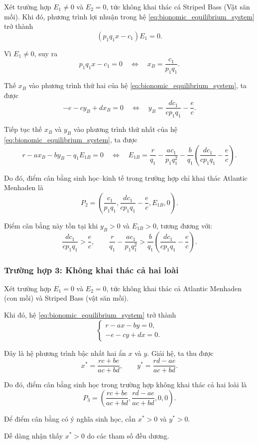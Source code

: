 Xét trường hợp $E_1\neq 0$ và $E_2=0$, tức không khai thác cá Striped Bass (Vật săn mồi).
Khi đó, phương trình lợi nhuận trong hệ
\eqref{eq:bionomic_equilibrium_system} trở thành
\[
(p_1q_1x-c_1)E_1=0.
\]

Vì $E_1\neq 0$, suy ra
\[
p_1q_1x-c_1=0
\quad\Longleftrightarrow\quad
x_B=\frac{c_1}{p_1q_1}.
\]

Thế $x_B$ vào phương trình thứ hai của hệ
\eqref{eq:bionomic_equilibrium_system}, ta được
\[
-e-cy_B+dx_B=0
\quad\Longleftrightarrow\quad
y_B=
\frac{dc_1}{cp_1q_1}-\frac{e}{c}.
\]

Tiếp tục thế $x_B$ và $y_B$ vào phương trình thứ nhất của hệ
\eqref{eq:bionomic_equilibrium_system}, ta được
\[
r-ax_B-by_B-q_1E_{1B}=0
\quad\Longleftrightarrow\quad
E_{1B}
=
\frac{r}{q_1}
-
\frac{ac_1}{p_1q_1^2}
-
\frac{b}{q_1}
\left(
\frac{dc_1}{cp_1q_1}-\frac{e}{c}
\right).
\]

Do đó, điểm cân bằng sinh học--kinh tế trong trường hợp chỉ khai thác
Atlantic Menhaden là
\[
P_2
=
\left(
\frac{c_1}{p_1q_1},
\frac{dc_1}{cp_1q_1}-\frac{e}{c},
E_{1B},
0
\right).
\]

Điểm cân bằng này tồn tại khi $y_B>0$ và $E_{1B}>0$, tương đương với:
\[
\frac{dc_1}{cp_1q_1}>\frac{e}{c},
\qquad
\frac{r}{q_1}
-
\frac{ac_1}{p_1q_1^2}
>
\frac{b}{q_1}
\left(
\frac{dc_1}{cp_1q_1}-\frac{e}{c}
\right).
\]

\subsubsection{Trường hợp 3: Không khai thác cả hai loài}

Xét trường hợp $E_1=0$ và $E_2=0$, tức không khai thác cả Atlantic Menhaden (con mồi) và Striped Bass (vật săn mồi).

Khi đó, hệ \eqref{eq:bionomic_equilibrium_system} trở thành
\[
\begin{cases}
r-ax-by=0,\\
-e-cy+dx=0.
\end{cases}
\]

Đây là hệ phương trình bậc nhất hai ẩn $x$ và $y$. Giải hệ, ta thu được
\[
x^*
=
\frac{rc+be}{ac+bd},
\qquad
y^*
=
\frac{rd-ae}{ac+bd}.
\]

Do đó, điểm cân bằng sinh học trong trường hợp không khai thác cả hai loài là
\[
P_3
=
\left(
\frac{rc+be}{ac+bd},
\frac{rd-ae}{ac+bd},
0,
0
\right).
\]

Để điểm cân bằng có ý nghĩa sinh học, cần $x^*>0$ và $y^*>0$. 

Dễ dàng nhận thấy $x^*>0$ do các tham số đều dương. 

